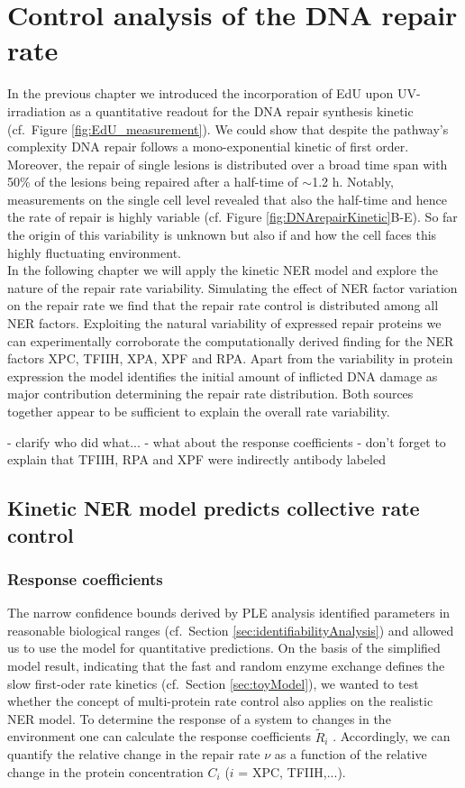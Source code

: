 \chapter{Control analysis of the DNA repair rate}

In the previous chapter we introduced the incorporation of EdU upon UV-irradiation as a quantitative readout for the DNA repair synthesis kinetic (cf.\ Figure \ref{fig:EdU_measurement}). We could show that despite the pathway's complexity DNA repair follows a mono-exponential kinetic of first order. Moreover, the repair of single lesions is distributed over a broad time span with 50\% of the lesions being repaired after a half-time of $\sim$1.2 h. Notably, measurements on the single cell level revealed that also the half-time and hence the rate of repair is highly variable (cf. Figure \ref{fig:DNArepairKinetic}B-E). So far the origin of this variability is unknown but also if and how the cell faces this highly fluctuating environment.\\  
In the following chapter we will apply the kinetic NER model and explore the nature of the repair rate variability. Simulating the effect of NER factor variation on the repair rate we find that the repair rate control is distributed among all NER factors. Exploiting the natural variability of expressed repair proteins we can experimentally corroborate the computationally derived finding for the NER factors XPC, TFIIH, XPA, XPF and RPA. Apart from the variability in protein expression the model identifies the initial amount of inflicted DNA damage as major contribution determining the repair rate distribution. Both sources together appear to be sufficient to explain the overall rate variability.     

- clarify who did what...
- what about the response coefficients
- don't forget to explain that TFIIH, RPA and XPF were indirectly antibody labeled

\section{Kinetic NER model predicts collective rate control}

 
\subsection{Response coefficients}

The narrow confidence bounds derived by PLE analysis identified parameters in reasonable biological ranges (cf.\ Section \ref{sec:identifiabilityAnalysis}) and allowed us to use the model for quantitative predictions. On the basis of the simplified model result, indicating that the fast and random enzyme exchange defines the slow first-oder rate kinetics (cf.\ Section \ref{sec:toyModel}), we wanted to test whether the concept of multi-protein rate control also applies on the realistic NER model. To determine the response of a system to changes in the environment one can calculate the response coefficients $\tilde{R}_i$ \cite{Hofmeyr1991,Fell1992}. Accordingly, we can quantify the relative change in the repair rate $\nu$ as a function of the relative change in the protein concentration $C_i$ ($i$ = XPC, TFIIH,...).

